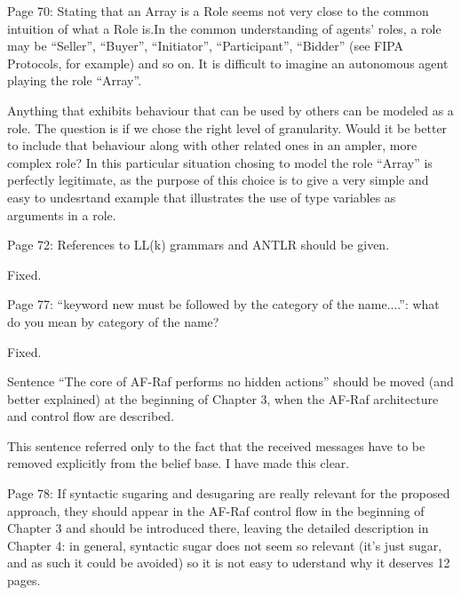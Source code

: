 \documentclass{article}
\newenvironment{them}{\noindent\begingroup\color{blue}}{\endgroup\par}
\begin{document}
\begin{them}

Page 70:
Stating that an Array is a Role seems not very close to the common intuition of
what a Role is.In the common understanding of agents' roles, a role may be
“Seller”, “Buyer”, “Initiator”, “Participant”, “Bidder” (see FIPA Protocols,
for example) and so on. It is difficult to imagine an autonomous agent playing
the role “Array”.

\end{them}
Anything that exhibits behaviour that can be used by others can be modeled as a
role. The question is if we chose the right level of granularity. Would it be
better to include that behaviour along with other related ones in an ampler,
more complex role? In this particular situation chosing to model the role
``Array'' is perfectly legitimate, as the purpose of this choice is to give a
very simple and easy to undesrtand example that illustrates the use of type
variables as arguments in a role.

\begin{them}

Page 72:
References to LL(k) grammars and ANTLR should be given.
\end{them}

Fixed.

\begin{them}

Page 77:
“keyword new must be followed by the category of the name....”: what do you
mean by category of the name?

\end{them}
Fixed.

\begin{them}

Sentence “The core of AF-Raf performs no hidden actions” should be moved (and
better explained) at the beginning of Chapter 3, when the AF-Raf architecture
and control flow are described.

\end{them}
This sentence referred only to the fact that the received messages have to be
removed explicitly from the belief base. I have made this clear.

\begin{them}

Page 78:
If syntactic sugaring and desugaring are really relevant for the proposed
approach, they should appear in the AF-Raf control flow in the beginning of
Chapter 3 and should be introduced there, leaving the detailed description in
Chapter 4: in general, syntactic sugar does not seem so relevant (it's just
sugar, and as such it could be avoided) so it is not easy to uderstand why it
deserves 12 pages.

\end{them}
\end{document}
